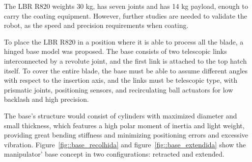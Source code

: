 The LBR R820 weights 30 kg, has seven joints and has 14 kg payload, enough to
carry the coating equipment. However, further studies are needed to validate
the robot, as the speed and precision requirements when coating.


To place the LBR R820 in a position where it is able to process all the
blade, a hinged base model was proposed. The base consists of two telescopic
links interconnected by a revolute joint, and the first link is attached to the
top hatch itself. To cover the entire blade, the base must be able to assume different angles with
respect to the insertion axis, and the links must be telescopic type, with
prismatic joints, positioning sensors, and recirculating ball actuators for low
backlash and high precision. 

The base's structure would consist of cylinders with maximized diameter and
small thickness, which features a high polar moment of inertia and light weight,
providing great bending stiffness and minimizing positioning errors and
excessive vibration. Figure~\ref{fig::base_recolhida} and
figure~\ref{fig::base_extendida} show the manipulator' base concept in two
configurations: retracted and extended.



